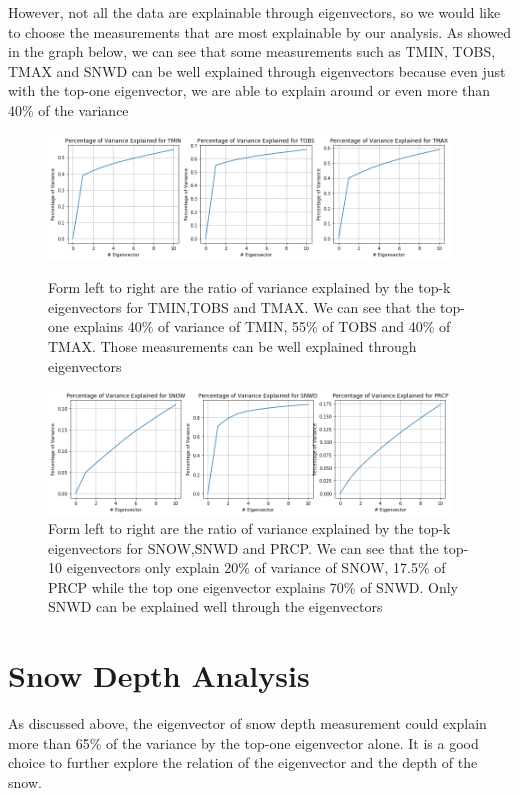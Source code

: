 \documentclass[a4paper]{article}
\begin{document}
\noindent However, not all the data are explainable through eigenvectors, so we would like to choose the measurements that are most explainable by our analysis. As showed in the graph below, we can see that some measurements such as TMIN, TOBS, TMAX and SNWD can be well explained through eigenvectors because even just with the top-one eigenvector, we are able to explain around or even more than 40\% of the variance
\begin{figure}[!htp]
\centering
\includegraphics[width=0.95\textwidth]{eigen_1.png}
\caption{\label{fig:t_eigen}Form left to right are the ratio of variance explained by the top-k eigenvectors for TMIN,TOBS and TMAX. We can see that the top-one explains 40\% of variance of TMIN, 55\% of TOBS and 40\% of TMAX. Those measurements can be well explained through eigenvectors}

\includegraphics[width=0.95\textwidth]{eigen_2.png}
\caption{\label{fig:t_eigen}Form left to right are the ratio of variance explained by the top-k eigenvectors for SNOW,SNWD and PRCP. We can see that the top-10 eigenvectors only explain 20\% of variance of SNOW, 17.5\% of PRCP while the top one eigenvector explains 70\% of SNWD. Only SNWD can be explained  well through the eigenvectors}

\end{figure}

\section{Snow Depth Analysis}
As discussed above, the eigenvector of snow depth measurement could explain more than 65\% of the variance by the top-one eigenvector alone. It is a good choice to further explore the relation of the eigenvector and the depth of the snow.
\end{document}
